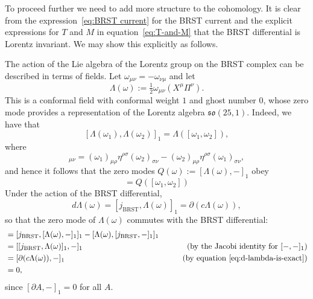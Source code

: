 \documentclass[11pt,reqno,a4paper,final]{amsart}
\theoremstyle{plain}
\theoremstyle{definition}
\newcommand{\so}{\mathfrak{so}}
\newcommand{\1}{\mathbb{1}}
\numberwithin{equation}{section}
\begin{document}
To proceed further we need to add more structure to the cohomology.
It is clear from the expression~\eqref{eq:BRST current} for the
BRST current and the explicit expressions for $T$ and $M$ in
equation~\eqref{eq:T-and-M} that the BRST differential is Lorentz
invariant.  We may show this explicitly as follows.

The action of the Lie algebra of the Lorentz group on the BRST complex
can be described in terms of fields.  Let $\omega_{\mu\nu} = -
\omega_{\nu\mu}$ and let
\begin{equation}
  \Lambda(\omega) := \tfrac12 \omega_{\mu\nu} \left( X^\mu \Pi^\nu \right).
\end{equation}
This is a conformal field with conformal weight $1$ and ghost number
$0$, whose zero mode provides a representation of the Lorentz algebra
$\so(25,1)$.  Indeed, we have that
\begin{equation}
  \label{eq:lorentz}
  [\Lambda(\omega_1), \Lambda(\omega_2)]_1 = \Lambda([\omega_1,\omega_2]),
\end{equation}
where
\begin{equation}
  [\omega_1,\omega_2]_{\mu\nu} = (\omega_1)_{\mu\rho}
  \eta^{\rho\sigma} (\omega_2)_{\sigma\nu} - (\omega_2)_{\mu\rho}
  \eta^{\rho\sigma} (\omega_1)_{\sigma\nu},
\end{equation}
and hence it follows that the zero modes $Q(\omega):= [\Lambda(\omega),-]_1$ obey
\begin{equation}
  [Q(\omega_1),Q(\omega_2)] = Q([\omega_1,\omega_2])
\end{equation}
Under the action of the BRST differential,
\begin{equation}
  \label{eq:d-lambda-is-exact}
  d \Lambda(\omega) = [j_{\text{BRST}},\Lambda(\omega)]_1 = \partial\left(  c \Lambda(\omega) \right),
\end{equation}
so that the zero mode of $\Lambda(\omega)$ commutes with the BRST
differential:
\begin{align*}
    [d,Q(\omega)] &= [j_{\text{BRST}},[\Lambda(\omega), -]_1]_1 -  [\Lambda(\omega),[j_{\text{BRST}},-]_1]_1\\
                  &= [[j_{\text{BRST}}, \Lambda(\omega)]_1,-]_1 & \tag{by the Jacobi identity for $[-,-]_1$}\\
                  &= [\partial(c \Lambda(\omega)),-]_1 & \tag{by equation~\eqref{eq:d-lambda-is-exact}}\\
                  &= 0,
\end{align*}
since $[\partial A, -]_1 = 0$ for all $A$.
\end{document}
